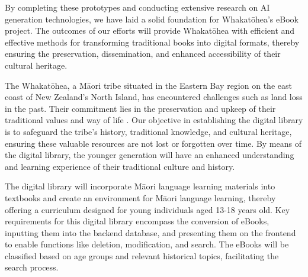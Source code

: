 By completing these prototypes and conducting extensive research on AI generation technologies, we have laid a solid foundation for Whakatōhea's eBook project. The outcomes of our efforts will provide Whakatōhea with efficient and effective methods for transforming traditional books into digital formats, thereby ensuring the preservation, dissemination, and enhanced accessibility of their cultural heritage.

The Whakatōhea, a Māori tribe situated in the Eastern Bay region on the east coast of New Zealand's North Island, has encountered challenges such as land loss in the past. Their commitment lies in the preservation and upkeep of their traditional values and way of life \autocite{Whakatoh25:online}. Our objective in establishing the digital library is to safeguard the tribe's history, traditional knowledge, and cultural heritage, ensuring these valuable resources are not lost or forgotten over time. By means of the digital library, the younger generation will have an enhanced understanding and learning experience of their traditional culture and history.

The digital library will incorporate Māori language learning materials into textbooks and create an environment for Māori language learning, thereby offering a curriculum designed for young individuals aged 13-18 years old. Key requirements for this digital library encompass the conversion of eBooks, inputting them into the backend database, and presenting them on the frontend to enable functions like deletion, modification, and search. The eBooks will be classified based on age groups and relevant historical topics, facilitating the search process.
